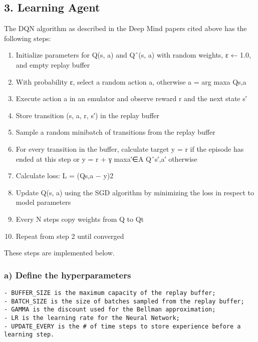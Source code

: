 \documentclass[11pt]{article}
\providecommand{\tightlist}{%
      \setlength{\itemsep}{0pt}\setlength{\parskip}{0pt}}
\begin{document}
    \hypertarget{learning-agent}{%
\subsection{3. Learning Agent}\label{learning-agent}}

The DQN algorithm as described in the Deep Mind papers cited above has
the following steps:

\begin{enumerate}
\def\labelenumi{\arabic{enumi}.}
\tightlist
\item
  Initialize parameters for Q(s, a) and Qˆ(s, a) with random weights, ε
  ← 1.0, and empty replay buffer
\item
  With probability ε, select a random action a, otherwise a = arg maxa
  Qs,a
\item
  Execute action a in an emulator and observe reward r and the next
  state s′
\item
  Store transition (s, a, r, s′) in the replay buffer
\item
  Sample a random minibatch of transitions from the replay buffer
\item
  For every transition in the buffer, calculate target y = r if the
  episode has ended at this step or y = r + γ maxa′∈A Qˆs′,a′ otherwise
\item
  Calculate loss: L = (Qs,a − y)2
\item
  Update Q(s, a) using the SGD algorithm by minimizing the loss in
  respect to model parameters
\item
  Every N steps copy weights from Q to Qt
\item
  Repeat from step 2 until converged
\end{enumerate}

These steps are implemented below.

    \hypertarget{a-define-the-hyperparameters}{%
\subsubsection{a) Define the
hyperparameters}\label{a-define-the-hyperparameters}}

\begin{verbatim}
- BUFFER_SIZE is the maximum capacity of the replay buffer;
- BATCH_SIZE is the size of batches sampled from the replay buffer;
- GAMMA is the discount used for the Bellman approximation;
- LR is the learning rate for the Neural Network;
- UPDATE_EVERY is the # of time steps to store experience before a learning step.
\end{verbatim}
\end{document}
